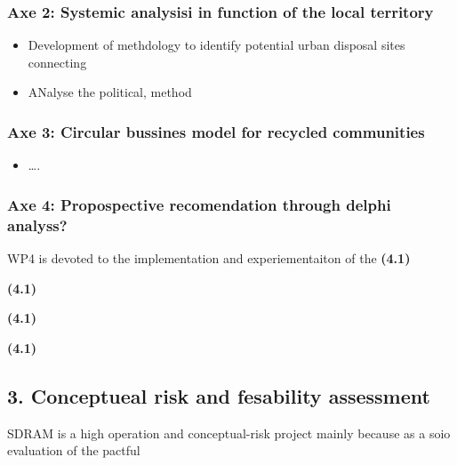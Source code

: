 \documentclass[
  11pt,
  a4paperpaper,
  onecolumn]{article}
\providecommand{\tightlist}{%
  \setlength{\itemsep}{0pt}\setlength{\parskip}{0pt}}\usepackage{longtable,booktabs,array}
\begin{document}
\hypertarget{axe-2-systemic-analysisi-in-function-of-the-local-territory}{%
\subsubsection{Axe 2: Systemic analysisi in function of the local
territory}\label{axe-2-systemic-analysisi-in-function-of-the-local-territory}}

\begin{itemize}
\tightlist
\item
  Development of methdology to identify potential urban disposal sites
  connecting
\item
  ANalyse the political, method
\end{itemize}

\hypertarget{axe-3-circular-bussines-model-for-recycled-communities}{%
\subsubsection{Axe 3: Circular bussines model for recycled
communities}\label{axe-3-circular-bussines-model-for-recycled-communities}}

\begin{itemize}
\tightlist
\item
  \ldots.
\end{itemize}

\hypertarget{axe-4-propospective-recomendation-through-delphi-analyss}{%
\subsubsection{Axe 4: Propospective recomendation through delphi
analyss?}\label{axe-4-propospective-recomendation-through-delphi-analyss}}

WP4 is devoted to the implementation and experiementaiton of the
\textbf{(4.1)}

\textbf{(4.1)}

\textbf{(4.1)}

\textbf{(4.1)}

\hypertarget{conceptueal-risk-and-fesability-assessment}{%
\subsection{3. Conceptueal risk and fesability
assessment}\label{conceptueal-risk-and-fesability-assessment}}

SDRAM is a high operation and conceptual-risk project mainly because as
a soio evaluation of the pactful
\end{document}
